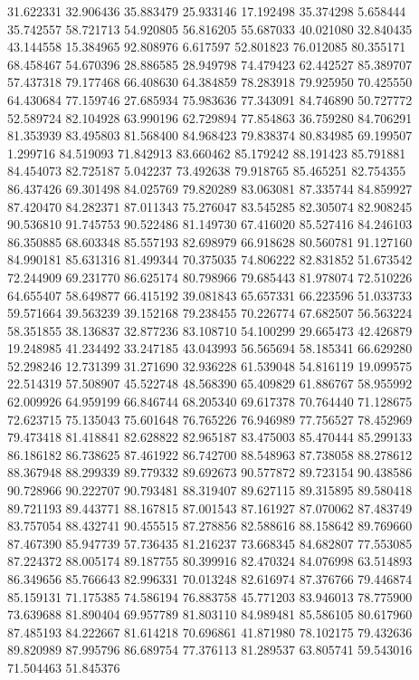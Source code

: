 31.622331
32.906436
35.883479
25.933146
17.192498
35.374298
5.658444
35.742557
58.721713
54.920805
56.816205
55.687033
40.021080
32.840435
43.144558
15.384965
92.808976
6.617597
52.801823
76.012085
80.355171
68.458467
54.670396
28.886585
28.949798
74.479423
62.442527
85.389707
57.437318
79.177468
66.408630
64.384859
78.283918
79.925950
70.425550
64.430684
77.159746
27.685934
75.983636
77.343091
84.746890
50.727772
52.589724
82.104928
63.990196
62.729894
77.854863
36.759280
84.706291
81.353939
83.495803
81.568400
84.968423
79.838374
80.834985
69.199507
1.299716
84.519093
71.842913
83.660462
85.179242
88.191423
85.791881
84.454073
82.725187
5.042237
73.492638
79.918765
85.465251
82.754355
86.437426
69.301498
84.025769
79.820289
83.063081
87.335744
84.859927
87.420470
84.282371
87.011343
75.276047
83.545285
82.305074
82.908245
90.536810
91.745753
90.522486
81.149730
67.416020
85.527416
84.246103
86.350885
68.603348
85.557193
82.698979
66.918628
80.560781
91.127160
84.990181
85.631316
81.499344
70.375035
74.806222
82.831852
51.673542
72.244909
69.231770
86.625174
80.798966
79.685443
81.978074
72.510226
64.655407
58.649877
66.415192
39.081843
65.657331
66.223596
51.033733
59.571664
39.563239
39.152168
79.238455
70.226774
67.682507
56.563224
58.351855
38.136837
32.877236
83.108710
54.100299
29.665473
42.426879
19.248985
41.234492
33.247185
43.043993
56.565694
58.185341
66.629280
52.298246
12.731399
31.271690
32.936228
61.539048
54.816119
19.099575
22.514319
57.508907
45.522748
48.568390
65.409829
61.886767
58.955992
62.009926
64.959199
66.846744
68.205340
69.617378
70.764440
71.128675
72.623715
75.135043
75.601648
76.765226
76.946989
77.756527
78.452969
79.473418
81.418841
82.628822
82.965187
83.475003
85.470444
85.299133
86.186182
86.738625
87.461922
86.742700
88.548963
87.738058
88.278612
88.367948
88.299339
89.779332
89.692673
90.577872
89.723154
90.438586
90.728966
90.222707
90.793481
88.319407
89.627115
89.315895
89.580418
89.721193
89.443771
88.167815
87.001543
87.161927
87.070062
87.483749
83.757054
88.432741
90.455515
87.278856
82.588616
88.158642
89.769660
87.467390
85.947739
57.736435
81.216237
73.668345
84.682807
77.553085
87.224372
88.005174
89.187755
80.399916
82.470324
84.076998
63.514893
86.349656
85.766643
82.996331
70.013248
82.616974
87.376766
79.446874
85.159131
71.175385
74.586194
76.883758
45.771203
83.946013
78.775900
73.639688
81.890404
69.957789
81.803110
84.989481
85.586105
80.617960
87.485193
84.222667
81.614218
70.696861
41.871980
78.102175
79.432636
89.820989
87.995796
86.689754
77.376113
81.289537
63.805741
59.543016
71.504463
51.845376
